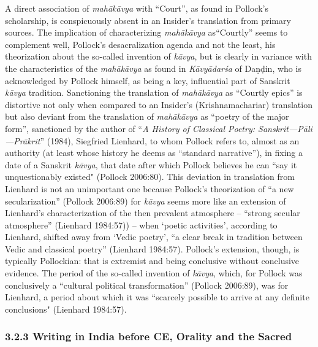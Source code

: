 A direct association of \textit{mahākāvya} with “Court”, as found in Pollock’s scholarship, is conspicuously absent in an Insider’s translation from primary sources. The implication of characterizing \textit{mahākāvya} as\break “Courtly” seems to complement well, Pollock’s desacralization agenda and not the least, his theorization about the so-called invention of \textit{kāvya}, but is clearly in variance with the characteristics of the \textit{mahā\-kāvya} as found in \textit{Kāvyādarśa} of Daṇḍin, who is acknowledged by Pollock himself, as being a key, influential part of Sanskrit \textit{kāvya} tradition. Sanctioning the translation of \textit{mahākāvya} as “Courtly epics” is distortive not only when compared to an Insider’s (Krishnamachariar) translation but also deviant from the translation of \textit{mahākāvya} as “poetry of the major form”, sanctioned by the author of “\textit{A History of Classical Poetry: Sanskrit—Pāli—Prākrit}”\textit{} (1984), Siegfried Lienhard, to whom Pollock refers to, almost as an authority (at least whose history he deems as “standard narrative”), in fixing a date of a Sanskrit \textit{kāvya}, that date after which Pollock believes he can “say it unquestionably existed" (Pollock 2006:80). This deviation in translation from Lienhard is not an unimportant one because Pollock’s theorization of “a new secularization” (Pollock 2006:89) for \textit{kāvya} seems more like an extension of Lienhard’s characterization of the then prevalent atmosphere – “strong secular atmosphere” (Lienhard 1984:57)) – when ‘poetic activities’, according to Lienhard, shifted away from ‘Vedic poetry’, “a clear break in tradition between Vedic and classical poetry” (Lienhard 1984:57). Pollock’s extension, though, is typically Pollockian: that is extremist and being conclusive without conclusive evidence. The period of the so-called invention of \textit{kāvya}, which, for Pollock was conclusively a “cultural political transformation” (Pollock 2006:89), was for Lienhard, a period about which it was “scarcely possible to arrive at any definite conclusions" (Lienhard 1984:57).


\subsubsection*{3.2.3 Writing in India before CE, Orality and the Sacred}

\vskip -3pt

